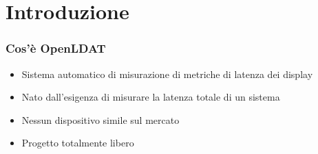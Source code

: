 \documentclass[xcolor={x11names}]{beamer}
\begin{document}
\hoffset=0mm %

\section{Introduzione}
\begin{frame}
	\frametitle{Cos'è OpenLDAT}
	\begin{itemize}
		\item Sistema automatico di \alert{misurazione di metriche di latenza dei display}
		\item Nato dall'esigenza di misurare la \alert{latenza totale di un sistema}
		\item \alert{Nessun dispositivo simile sul mercato}
		\item Progetto totalmente \alert{libero}
	\end{itemize}
\end{frame}
\end{document}
